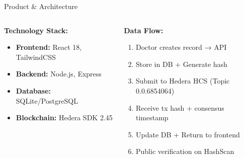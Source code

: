 \documentclass[aspectratio=169,xcolor=dvipsnames,20pt]{beamer}
\begin{document}
\begin{frame}[fragile]{Product \& Architecture}
\begin{center}
  \end{center}

  \vspace{0.3cm}

  \begin{columns}[T]
    \begin{column}{0.5\textwidth}
      \textbf{Technology Stack:}
      \begin{itemize}
        \item \textbf{Frontend:} React 18, TailwindCSS
        \item \textbf{Backend:} Node.js, Express
        \item \textbf{Database:} SQLite/PostgreSQL
        \item \textbf{Blockchain:} Hedera SDK 2.45
      \end{itemize}
    \end{column}

    \begin{column}{0.5\textwidth}
      \textbf{Data Flow:}
      \begin{enumerate}
        \item Doctor creates record → API
        \item Store in DB + Generate hash
        \item Submit to Hedera HCS (Topic 0.0.6854064)
        \item Receive tx hash + consensus timestamp
        \item Update DB + Return to frontend
        \item \textcolor{SuccessGreen}{Public verification on HashScan}
      \end{enumerate}
    \end{column}
  \end{columns}

\end{frame}
\end{document}
